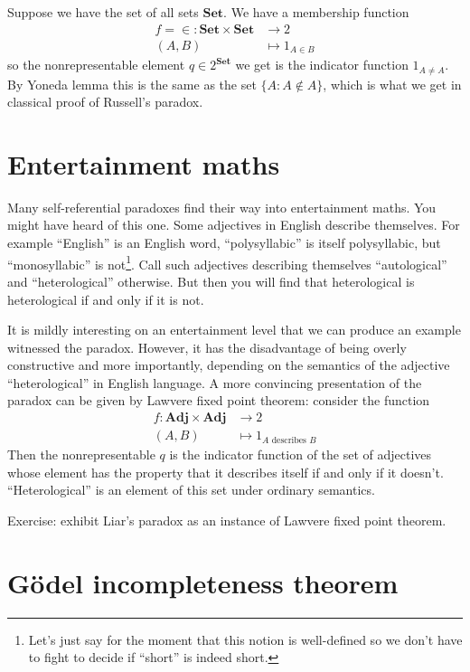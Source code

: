 \documentclass[a4paper]{article}
\renewcommand{\c}[1]{\mathbf{#1}}
\newcommand{\Set}{{\c{Set}}}
\begin{document}
Suppose we have the set of all sets \(\Set\). We have a membership function
\begin{align*}
  f = \in: \Set \times \Set &\to 2 \\
  (A, B) &\mapsto 1_{A \in B}
\end{align*}
so the nonrepresentable element \(q \in 2^\Set\) we get is the indicator function \(1_{A \neq A}\). By Yoneda lemma this is the same as the set \(\{A: A \notin A\}\), which is what we get in classical proof of Russell's paradox.

\section{Entertainment maths}

Many self-referential paradoxes find their way into entertainment maths. You might have heard of this one. Some adjectives in English describe themselves. For example ``English'' is an English word, ``polysyllabic'' is itself polysyllabic, but ``monosyllabic'' is not\footnote{Let's just say for the moment that this notion is well-defined so we don't have to fight to decide if ``short'' is indeed short.}. Call such adjectives describing themselves ``autological'' and ``heterological'' otherwise. But then you will find that heterological is heterological if and only if it is not.

It is mildly interesting on an entertainment level that we can produce an example witnessed the paradox. However, it has the disadvantage of being overly constructive and more importantly, depending on the semantics of the adjective ``heterological'' in English language. A more convincing presentation of the paradox can be given by Lawvere fixed point theorem: consider the function
\begin{align*}
  f: \c{Adj} \times \c{Adj} &\to 2 \\
  (A, B) &\mapsto 1_{A \text{ describes } B}
\end{align*}
Then the nonrepresentable \(q\) is the indicator function of the set of adjectives whose element has the property that it describes itself if and only if it doesn't. ``Heterological'' is an element of this set under ordinary semantics.

Exercise: exhibit Liar's paradox as an instance of Lawvere fixed point theorem.

\section{Gödel incompleteness theorem}
\end{document}
